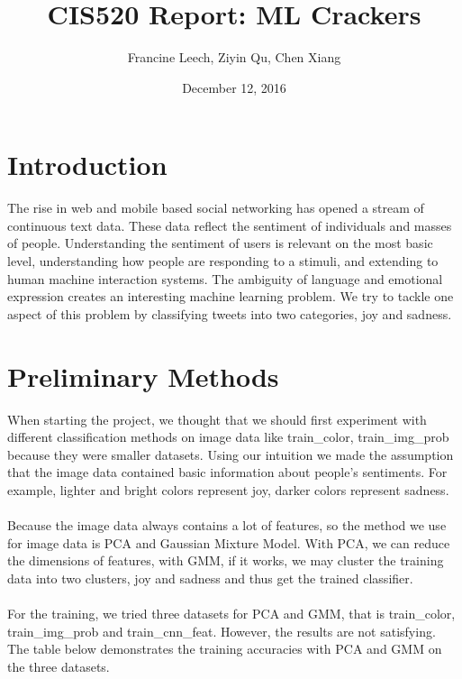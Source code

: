 \documentclass[]{article}
\begin{document}
\title{CIS520 Report: ML Crackers}   %
\author{Francine Leech, Ziyin Qu, Chen Xiang}         %
\date{December 12, 2016}    %
\maketitle

\section{Introduction}

The rise in web and mobile based social networking has opened a stream of continuous text data. These data reflect the sentiment of individuals and masses of people. Understanding the sentiment of users is relevant on the most basic level, understanding how people are responding to a stimuli, and extending to human machine interaction systems. The ambiguity of language and emotional expression creates an interesting machine learning problem.  We try to tackle one aspect of this problem by classifying tweets into two categories, joy and sadness. 

\section{Preliminary Methods}

When starting the project, we thought that we should first experiment with different classification methods on image data like train\_color, train\_img\_prob because they were smaller datasets. Using our intuition we made the assumption that the image data contained basic information about people's sentiments. For example, lighter and bright colors represent joy, darker colors represent sadness. \\\\

Because the image data always contains a lot of features, so the method we use for image data is PCA and Gaussian Mixture Model. With PCA, we can reduce the dimensions of features, with GMM, if it works, we may cluster the training data into two clusters, joy and sadness and thus get the trained classifier. \\\\

For the training, we tried three datasets for PCA and GMM, that is train\_color, train\_img\_prob and train\_cnn\_feat. However, the results are not satisfying. The table below demonstrates the training accuracies with PCA and GMM on the three datasets.
\end{document}

